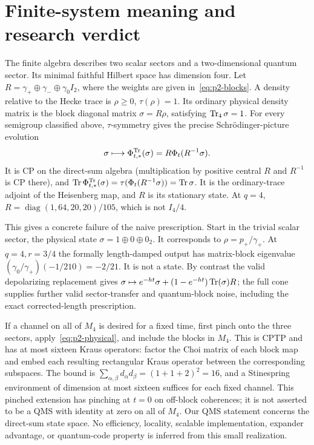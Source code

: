 \section{Finite-system meaning and research verdict}
The finite algebra describes two scalar sectors and a two-dimensional
quantum sector. Its minimal faithful Hilbert space has dimension four.
Let $R=\gamma_+\oplus\gamma_-\oplus\gamma_0I_2$, where the weights are
given in~\eqref{eq:p2-blocks}. A density relative to the Hecke trace is
$\rho\geq0$, $\tau(\rho)=1$. Its ordinary physical density matrix is
the block diagonal matrix $\sigma=R\rho$, satisfying $\operatorname{Tr}_4\sigma=1$.
For every semigroup classified above, $\tau$-symmetry gives the precise
Schr\"odinger-picture evolution
\begin{equation}\label{eq:p2-physical}
 \sigma\longmapsto\Phi_{t,*}^{\operatorname{Tr}}(\sigma)
       =R\Phi_t(R^{-1}\sigma).
\end{equation}
It is CP on the direct-sum algebra (multiplication by positive central
$R$ and $R^{-1}$ is CP there), and
$\operatorname{Tr}\Phi_{t,*}^{\operatorname{Tr}}(\sigma)=\tau(\Phi_t(R^{-1}\sigma))=\operatorname{Tr}\sigma$.
It is the ordinary-trace adjoint of the Heisenberg map, and $R$ is its
stationary state. At $q=4$, $R=\operatorname{diag}(1,64,20,20)/105$,
which is not $I_4/4$.

This gives a concrete failure of the naive prescription. Start in the
trivial scalar sector, the physical state $\sigma=1\oplus0\oplus0_2$.
It corresponds to $\rho=p_+/\gamma_+$. At $q=4,r=3/4$ the formally
length-damped output has matrix-block eigenvalue
$(\gamma_0/\gamma_+)(-1/210)=-2/21$. It is not a state.
By contrast the valid depolarizing replacement gives
$\sigma\mapsto e^{-ht}\sigma+(1-e^{-ht})\operatorname{Tr}(\sigma)R$;
the full cone supplies further valid sector-transfer and quantum-block
noise, including the exact corrected-length prescription.

If a channel on all of $M_4$ is desired for a fixed time, first pinch onto
the three sectors, apply~\eqref{eq:p2-physical}, and include the blocks
in $M_4$. This is CPTP and has at most sixteen Kraus operators: factor
the Choi matrix of each block map and embed each resulting rectangular
Kraus operator between the corresponding subspaces. The bound is
$\sum_{\alpha,\beta}d_\alpha d_\beta=(1+1+2)^2=16$, and a Stinespring
environment of dimension at most sixteen suffices for each fixed channel.
This pinched extension has pinching at $t=0$ on off-block coherences;
it is not asserted to be a QMS with identity at zero on all of $M_4$.
Our QMS statement concerns the direct-sum state space. No efficiency,
locality, scalable implementation, expander advantage, or quantum-code
property is inferred from this small realization.

